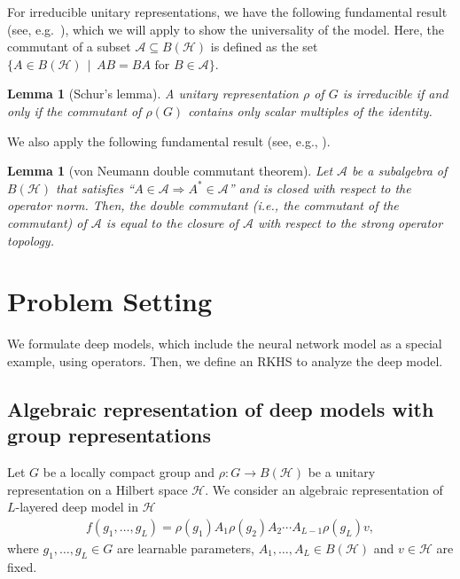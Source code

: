 \documentclass[twoside]{article}
\newtheorem{lemma}[proposition]{Lemma}
\def\mcl#1{\mathcal{#1}}
\def\hil{\mcl{H}}
\def\alg{\mcl{A}}
\begin{document}
For irreducible unitary representations, we have the following fundamental result (see, e.g.~\citet[Lemma 3.5]{folland95}), which we will apply to show the universality of the model.
Here, the commutant of a subset $\mcl{A}\subseteq B(\hil)$ is defined as the set $\{A\in B(\hil)\,\mid\,AB=BA\mbox{ for }B\in\alg \}$.
\begin{lemma}[Schur's lemma]\label{lem:schur_original}
A unitary representation $\rho$ of $G$ is irreducible if and only if the commutant of $\rho(G)$ contains only scalar multiples of the identity.
\end{lemma}
We also apply the following fundamental result (see, e.g., \citet[Theorem I.7.1]{davidson96}). %
\begin{lemma}[von Neumann double commutant theorem]\label{lem:double_commutant}
Let $\alg$ be a subalgebra of $B(\hil)$ that satisfies ``$A\in \alg\Rightarrow A^*\in\alg$'' and is closed with respect to the operator norm. %
Then, the double commutant (i.e., the commutant of the commutant) of $\alg$ is equal to the closure of $\alg$ with respect to the strong operator topology.
\end{lemma}


\section{Problem Setting}\label{sec:representation_setting}
We formulate deep models, which include the neural network model as a special example, using operators.
Then, we define an RKHS to analyze the deep model.
\subsection{Algebraic representation of deep models with group representations}\label{subsec:model_deep}
Let $G$ be a locally compact group and $\rho: G \to B(\mathcal{H})$ be a unitary representation on a Hilbert space $\mathcal{H}$.
We consider an algebraic representation of $L$-layered deep model in $\hil$
\begin{align}
f(g_1,\ldots,g_L) = \rho(g_1) A_1 \rho(g_2) A_2 \cdots A_{L-1} \rho(g_L) v,\label{eq:deep_model}
\end{align}
where $g_1,\ldots,g_L\in G$ are learnable parameters, $A_1,\ldots, A_L\in B(\mathcal{H})$ and $v\in \hil$ are fixed.
\end{document}

